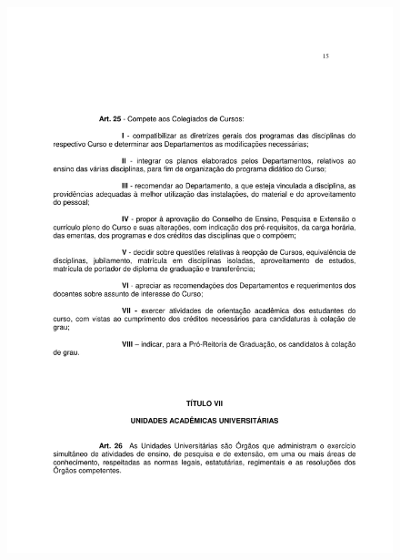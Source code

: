 \begin{figure}[p]
	\centering 
	\includegraphics[scale=0.7]{capitulos/resolucoes/cuni414/cuni414-15.pdf}
\end{figure} \pagebreak

